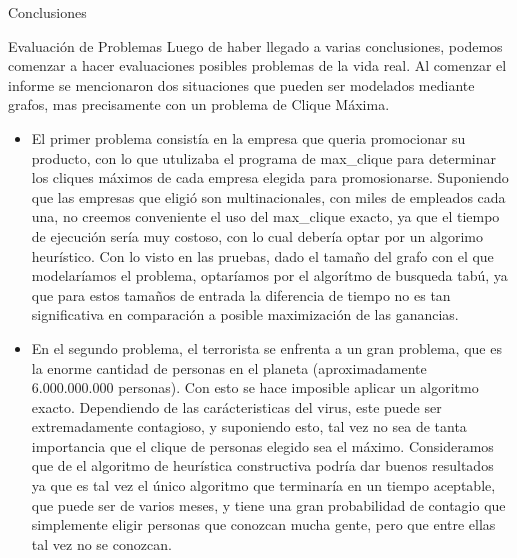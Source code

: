 \documentclass[12pt,titlepage]{article}
\newcommand{\tab}{\hspace*{2em}}
\begin{document}
\begin{section}{Conclusiones}
		\begin{subsection}{Evaluación de Problemas}
		\tab Luego de haber llegado a varias conclusiones, podemos comenzar a hacer evaluaciones posibles problemas de la vida real. Al comenzar el informe se mencionaron dos situaciones que pueden ser modelados mediante grafos, mas precisamente con un problema de Clique Máxima. 
			\begin{itemize}
			\item El primer problema consistía en la empresa que queria promocionar su producto, con lo que utulizaba el programa de max\_clique para determinar los cliques máximos de cada empresa elegida para promosionarse. Suponiendo que las empresas que eligió son multinacionales, con miles de empleados cada una, no creemos conveniente el uso del max\_clique exacto, ya que el tiempo de ejecución sería muy costoso, con lo cual debería optar por un algorimo heurístico. Con lo visto en las pruebas, dado el tamaño del grafo con el que modelaríamos el problema, optaríamos por el algorítmo de busqueda tabú, ya que para estos tamaños de entrada la diferencia de tiempo no es tan significativa en comparación a posible maximización de las ganancias.
			\item En el segundo problema, el terrorista se enfrenta a un gran problema, que es la enorme cantidad de personas en el planeta (aproximadamente 6.000.000.000 personas). Con esto se hace imposible aplicar un algoritmo exacto. Dependiendo de las carácteristicas del virus, este puede ser extremadamente contagioso, y suponiendo esto, tal vez no sea de tanta importancia que el clique de personas elegido sea el máximo. Consideramos que de el algoritmo de heurística constructiva podría dar buenos resultados ya que es tal vez el único algoritmo que terminaría en un tiempo aceptable, que puede ser de varios meses, y tiene una gran probabilidad de contagio que simplemente eligir personas que conozcan mucha gente, pero que entre ellas tal vez no se conozcan.
			\end{itemize}
		\end{subsection}
	
	\end{section}
	
\end{document}
